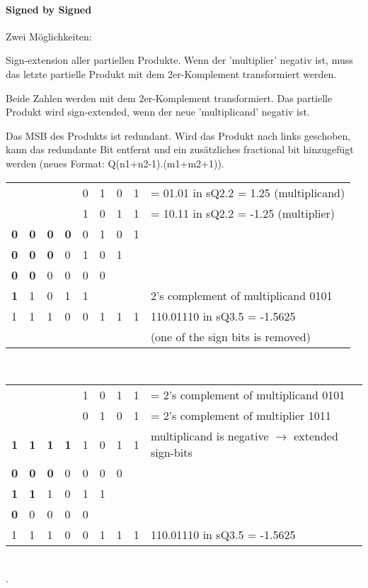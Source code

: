 \paragraph{Signed by Signed}$~$ \\
Zwei Möglichkeiten:
\begin{compactitem}
  \item Sign-extension aller partiellen Produkte. Wenn der 'multiplier' negativ ist, muss das letzte partielle Produkt mit dem 2er-Komplement transformiert werden.
  \item Beide Zahlen werden mit dem 2er-Komplement transformiert. Das partielle Produkt wird sign-extended, wenn der neue 'multiplicand' negativ ist.
\end{compactitem}
Das MSB des Produkts ist redundant. Wird das Produkt nach links geschoben, kann das redundante Bit entfernt und ein zusätzliches fractional bit hinzugefügt werden (neues Format: Q(n1+n2-1).(m1+m2+1)).\\
\begin{minipage}{0.7\linewidth}
  \begin{tabular}{ l l l l l l l l | l}
  & & & & 0 & 1 & 0 & 1 & = 01.01 in sQ2.2 = 1.25 (multiplicand)\\
  & & & & 1 & 0 & 1 & 1 & = 10.11 in sQ2.2 = -1.25 (multiplier)\\
  \hline
  \textbf{0} & \textbf{0} & \textbf{0} & \textbf{0} & 0 & 1 & 0 & 1 & \\
  \textbf{0} & \textbf{0} & \textbf{0} & 0 & 1 & 0 & 1 & & \\
  \textbf{0} & \textbf{0} & 0 & 0 & 0 & 0 & & & \\
  \textbf{1} & 1 & 0 & 1 & 1 & & & & 2's complement of multiplicand 0101\\
  \hline
  1 & 1 & 1 & 0 & 0 & 1 & 1 & 1 & 110.01110 in sQ3.5 = -1.5625\\
  & & & & & & & & (one of the sign bits is removed)\\
  \end{tabular}
\end{minipage}\\
\begin{minipage}{0.7\linewidth}
  \begin{tabular}{ l l l l l l l l | l}
  & & & & 1 & 0 & 1 & 1 & = 2's complement of multiplicand 0101\\
  & & & & 0 & 1 & 0 & 1 & = 2's complement of multiplier 1011\\
  \hline
  \textbf{1} & \textbf{1} & \textbf{1} & \textbf{1} & 1 & 0 & 1 & 1 & multiplicand is negative $\rightarrow$ extended sign-bits\\
  \textbf{0} & \textbf{0} & \textbf{0} & 0 & 0 & 0 & 0 & & \\
  \textbf{1} & \textbf{1} & 1 & 0 & 1 & 1 & & & \\
  \textbf{0} & 0 & 0 & 0 & 0 & & & & \\
  \hline
  1 & 1 & 1 & 0 & 0 & 1 & 1 & 1 & 110.01110 in sQ3.5 = -1.5625
  \end{tabular}
\end{minipage}\\.
